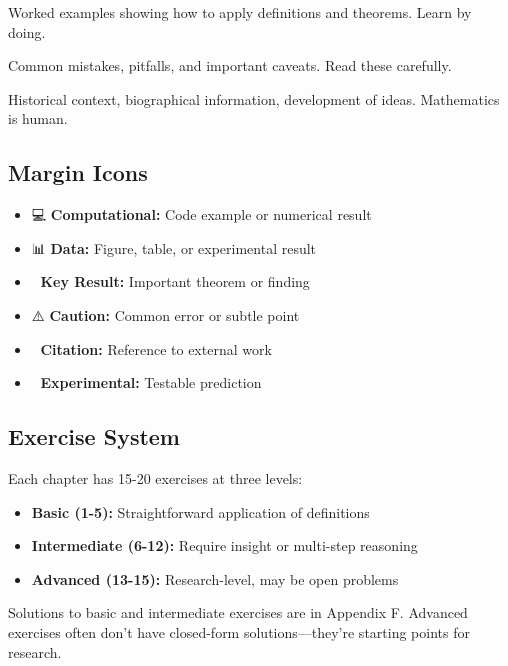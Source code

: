 \begin{example}[title={Yellow Boxes}]
Worked examples showing how to apply definitions and theorems. Learn by doing.
\end{example}

\begin{warning}[title={Red Boxes}]
Common mistakes, pitfalls, and important caveats. Read these carefully.
\end{warning}

\begin{historicalnote}[title={Purple Boxes}]
Historical context, biographical information, development of ideas. Mathematics is human.
\end{historicalnote}

\subsection*{Margin Icons}

\begin{itemize}
\item 💻 \textbf{Computational:} Code example or numerical result
\item 📊 \textbf{Data:} Figure, table, or experimental result
\item 🎯 \textbf{Key Result:} Important theorem or finding
\item ⚠️ \textbf{Caution:} Common error or subtle point
\item 📖 \textbf{Citation:} Reference to external work
\item 🔬 \textbf{Experimental:} Testable prediction
\end{itemize}

\subsection*{Exercise System}

Each chapter has 15-20 exercises at three levels:

\begin{itemize}
\item \textbf{Basic (1-5):} Straightforward application of definitions
\item \textbf{Intermediate (6-12):} Require insight or multi-step reasoning
\item \textbf{Advanced (13-15):} Research-level, may be open problems
\end{itemize}

Solutions to basic and intermediate exercises are in Appendix F. Advanced exercises often don't have closed-form solutions—they're starting points for research.

